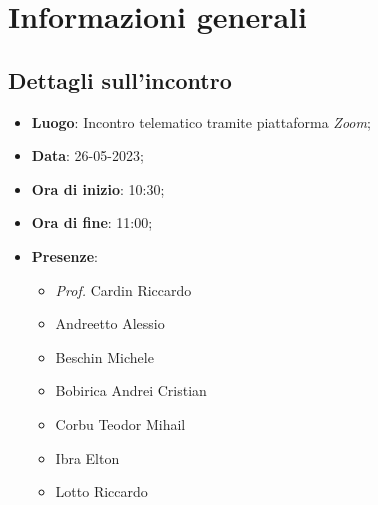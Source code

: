 \section{Informazioni generali}

\subsection{Dettagli sull'incontro}
\begin{itemize}
\item \textbf{Luogo}: Incontro telematico tramite piattaforma \textit{Zoom\glo};
\item \textbf{Data}: 26-05-2023;
\item \textbf{Ora di inizio}: 10:30;
\item \textbf{Ora di fine}: 11:00;
\item \textbf{Presenze}: 
\begin{itemize}
    \item \textit{Prof.} Cardin Riccardo
	\item Andreetto Alessio
    \item Beschin Michele
    \item Bobirica Andrei Cristian
    \item Corbu Teodor Mihail
    \item Ibra Elton
    \item Lotto Riccardo 
\end{itemize}
\end{itemize}


